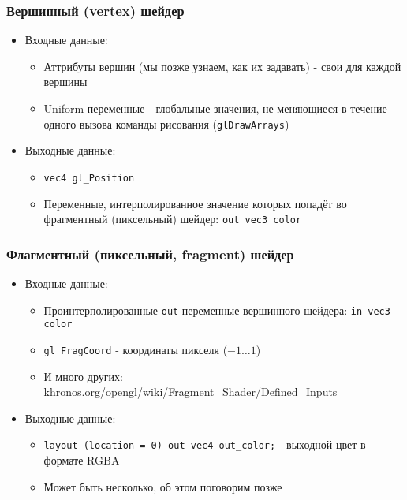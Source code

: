 \documentclass{beamer}
\begin{document}
\begin{frame}[fragile]
\frametitle{Вершинный (vertex) шейдер}
\begin{itemize}
\pause
\item Входные данные:
\pause
\begin{itemize}
\item Аттрибуты вершин (мы позже узнаем, как их задавать) - свои для каждой вершины
\pause
\item Uniform-переменные - глобальные значения, не меняющиеся в течение одного вызова команды рисования (\verb|glDrawArrays|)
\end{itemize}
\pause
\item Выходные данные:
\begin{itemize}
\item \verb|vec4 gl_Position|
\pause
\item Переменные, интерполированное значение которых попадёт во фрагментный (пиксельный) шейдер: \verb|out vec3 color|
\end{itemize}
\end{itemize}
\end{frame}

\begin{frame}[fragile]
\frametitle{Флагментный (пиксельный, fragment) шейдер}
\begin{itemize}
\pause
\item Входные данные:
\pause
\begin{itemize}
\item Проинтерполированные \verb|out|-переменные вершинного шейдера: \verb|in vec3 color|
\pause
\item \verb|gl_FragCoord| - координаты пикселя (\begin{math}-1 \dots 1\end{math})
\pause
\item И много других: \href{https://www.khronos.org/opengl/wiki/Fragment_Shader/Defined_Inputs}{khronos.org/opengl/wiki/Fragment\_Shader/Defined\_Inputs}
\end{itemize}
\pause
\item Выходные данные:
\begin{itemize}
\item \verb|layout (location = 0) out vec4 out_color;| - выходной цвет в формате RGBA
\pause
\item Может быть несколько, об этом поговорим позже
\end{itemize}
\end{itemize}
\end{frame}
\end{document}
